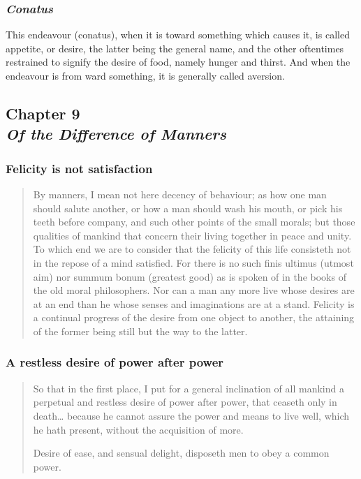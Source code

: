         \subsubsection{\textit{Conatus}}

            This endeavour (conatus), when it is toward something which causes it, is called appetite, or desire, the latter being the general name, and the other oftentimes restrained to signify the desire of food, namely hunger and thirst. And when the endeavour is from ward something, it is generally called aversion.

    \subsection[Of the Difference of Manners]{Chapter 9 \\ \textit{Of the Difference of Manners}}

        \subsubsection{Felicity is not satisfaction}

            \begin{quote}
                By manners, I mean not here decency of behaviour; as how one man should salute another, or how a man should wash his mouth, or pick his teeth before company, and such other points of the small morals; but those qualities of mankind that concern their living together in peace and unity. To which end we are to consider that the felicity of this life consisteth not in the repose of a mind satisfied. For there is no such finis ultimus (utmost aim) nor summum bonum (greatest good) as is spoken of in the books of the old moral philosophers. Nor can a man any more live whose desires are at an end than he whose senses and imaginations are at a stand. Felicity is a continual progress of the desire from one object to another, the attaining of the former being still but the way to the latter.
            \end{quote}

        \subsubsection{A restless desire of power after power}

            \begin{quote}
                So that in the first place, I put for a general inclination of all mankind a perpetual and restless desire of power after power, that ceaseth only in death… because he cannot assure the power and means to live well, which he hath present, without the acquisition of more.
                
                Desire of ease, and sensual delight, disposeth men to obey a common power.
            \end{quote}


